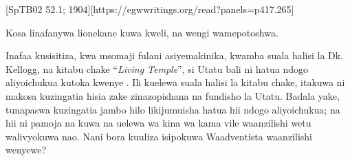 [SpTB02 52.1; 1904][https://egwwritings.org/read?panels=p417.265]


Kosa linafanywa lionekane kuwa kweli, na wengi wamepotoshwa.


Inafaa kusisitiza, kwa msomaji fulani asiyemakinika, kwamba suala halisi la Dk. Kellogg, na kitabu chake “\textit{Living Temple}”, si Utatu bali ni hatua ndogo aliyoichukua kutoka kwenye . Ili kuelewa suala halisi la kitabu chake, itakuwa ni makosa kuzingatia hisia zake zinazopishana na fundisho la Utatu. Badala yake, tunapaswa kuzingatia jambo hilo likijumuisha hatua hii ndogo aliyoichukua; na hii ni pamoja na kuwa na uelewa wa kina wa  kama vile waanzilishi wetu walivyokuwa nao. Nani bora kuuliza isipokuwa Waadventista waanzilishi wenyewe?




